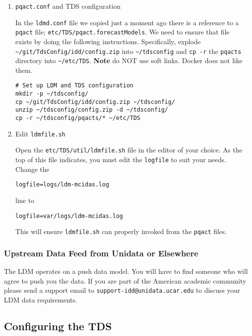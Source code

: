 \documentclass[11pt]{article}
\begin{document}
\begin{enumerate}
\item \texttt{pqact.conf} and TDS configuration
\label{sec:orgheadline20}

In the \texttt{ldmd.conf} file we copied just a moment ago there is a reference to a \texttt{pqact} file; \texttt{etc/TDS/pqact.forecastModels}. We need to ensure that file exists by doing the following instructions. Specifically, explode \texttt{\textasciitilde{}/git/TdsConfig/idd/config.zip} into \texttt{\textasciitilde{}/tdsconfig} and \texttt{cp -r} the \texttt{pqacts} directory into \texttt{\textasciitilde{}/etc/TDS}. \textbf{Note} do NOT use soft links. Docker does not like them.

\begin{verbatim}
# Set up LDM and TDS configuration
mkdir -p ~/tdsconfig/
cp ~/git/TdsConfig/idd/config.zip ~/tdsconfig/
unzip ~/tdsconfig/config.zip -d ~/tdsconfig/
cp -r ~/tdsconfig/pqacts/* ~/etc/TDS
\end{verbatim}

\item \label{orgtarget2} Edit \texttt{ldmfile.sh}
\label{sec:orgheadline21}

Open the \texttt{etc/TDS/util/ldmfile.sh} file in the editor of your choice. As the top of this file indicates, you must edit the \texttt{logfile} to suit your needs. Change the 

\begin{verbatim}
logfile=logs/ldm-mcidas.log
\end{verbatim}

line to

\begin{verbatim}
logfile=var/logs/ldm-mcidas.log
\end{verbatim}

This will ensure \texttt{ldmfile.sh} can properly invoked from the \texttt{pqact} files.
\end{enumerate}

\subsubsection{Upstream Data Feed from Unidata or Elsewhere}
\label{sec:orgheadline23}

The LDM operates on a push data model. You will have to find someone who will agree to push you the data. If you are part of the American academic community please send a support email to \texttt{support-idd@unidata.ucar.edu} to discuss your LDM data requirements.

\subsection{Configuring the TDS}
\label{sec:orgheadline26}
\end{document}
